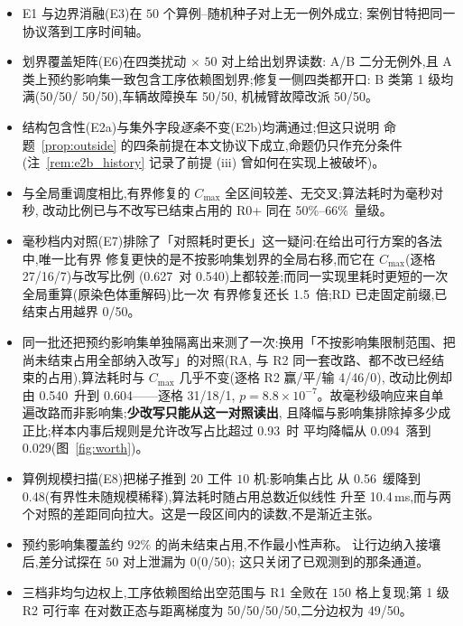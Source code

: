 \documentclass[manuscript,screen,review]{acmart}
\newcommand{\NPairs}{50}
\newcommand{\ResFracRtwo}{50\%--66\%}
\newcommand{\ClosureAliveFrac}{92\%}
\newcommand{\RedecodeRatio}{1.5}     %
\newcommand{\RedecodeBad}{0/\NPairs}
\newcommand{\WinVsShift}{27/16/7}    %
\newcommand{\WinVsAllFuture}{4/46/0}
\newcommand{\ResFracCheapRtwo}{0.540}
\newcommand{\ResFracShift}{0.627}
\newcommand{\ResFracAllFuture}{0.604}
\newcommand{\RAStabWTL}{31/18/1}     %
\newcommand{\RAStabP}{8.8\times10^{-7}}  %
\newcommand{\ScaleJobsHi}{20}
\newcommand{\ScaleMachHi}{10}
\newcommand{\ScaleCloLo}{0.48}       %
\newcommand{\ScaleCloHi}{0.56}       %
\newcommand{\ScaleMsHi}{10.4}        %
\newcommand{\WorthThresh}{0.93}
\newcommand{\WorthLowMean}{0.094}
\newcommand{\WorthHighMean}{0.029}
\newcommand{\ProbeLeakPairs}{0/50}
\newcommand{\ProbeLeaks}{0}
\newcommand{\FeasESixBlock}{\NPairs/\NPairs}
\newcommand{\FeasSlow}{\NPairs/\NPairs}
\newcommand{\FeasESixAgv}{\NPairs/\NPairs}
\newcommand{\FeasESixRa}{\NPairs/\NPairs}
\newcommand{\WeightLogRtwo}{\NPairs/\NPairs}
\newcommand{\WeightLuRtwo}{\NPairs/\NPairs}
\newcommand{\WeightSplitRtwo}{49/\NPairs}
\begin{document}
\begin{itemize}[leftmargin=1.5em,itemsep=0.25em]
\item E1 与边界消融(E3)在 \(\NPairs\) 个算例--随机种子对上无一例外成立;
案例甘特把同一协议落到工序时间轴。
\item 划界覆盖矩阵(E6)在四类扰动 \(\times\) \(\NPairs\) 对上给出划界读数:
A/B 二分无例外,且 A 类上预约影响集一致包含工序依赖图划界;修复一侧四类都开口:
B 类第 1 级均满(\FeasESixBlock / \FeasSlow),车辆故障换车 \FeasESixAgv,
机械臂故障改派 \FeasESixRa。
\item 结构包含性(E2a)与集外字段\emph{逐条}不变(E2b)均满通过;但这只说明
命题~\ref{prop:outside} 的四条前提在本文协议下成立,命题仍只作充分条件
(注~\ref{rem:e2b_history} 记录了前提 (iii) 曾如何在实现上被破坏)。
\item 与全局重调度相比,有界修复的 \(C_{\max}\) 全区间较差、无交叉;算法耗时为毫秒对秒,
改动比例已与不改写已结束占用的 R0+ 同在 \ResFracRtwo\ 量级。
\item 毫秒档内对照(E7)排除了「对照耗时更长」这一疑问:在给出可行方案的各法中,唯一比有界
修复更快的是不按影响集划界的全局右移,而它在 \(C_{\max}\)(逐格 \WinVsShift)与改写比例
(\ResFracShift\ 对 \ResFracCheapRtwo)上都较差;而同一实现里耗时更短的一次全局重算(原染色体重解码)比一次
有界修复还长 \RedecodeRatio\ 倍;RD 已走固定前缀,已结束占用越界 \RedecodeBad。
\item 同一批还把预约影响集单独隔离出来测了一次:换用「不按影响集限制范围、把尚未结束占用全部纳入改写」的对照(RA,
与 R2 同一套改路、都不改已经结束的占用),算法耗时与 \(C_{\max}\) 几乎不变(逐格 R2 赢/平/输 \WinVsAllFuture),
改动比例却由 \ResFracCheapRtwo\ 升到 \ResFracAllFuture——逐格 \RAStabWTL,
\(p=\RAStabP\)。故毫秒级响应来自单遍改路而非影响集;\textbf{少改写只能从这一对照读出},
且降幅与影响集排除掉多少成正比;样本内事后规则是允许改写占比超过 \WorthThresh\ 时
平均降幅从 \WorthLowMean\ 落到 \WorthHighMean(图~\ref{fig:worth})。
\item 算例规模扫描(E8)把梯子推到 \(\ScaleJobsHi\) 工件 \(\ScaleMachHi\) 机:影响集占比
从 \ScaleCloHi\ 缓降到 \ScaleCloLo(有界性未随规模稀释),算法耗时随占用总数近似线性
升至 \ScaleMsHi\,ms,而与两个对照的差距同向拉大。这是一段区间内的读数,不是渐近主张。
\item 预约影响集覆盖约 \(\ClosureAliveFrac\) 的尚未结束占用,不作最小性声称。
让行边纳入接壤后,差分试探在 \(\NPairs\) 对上泄漏为 \ProbeLeaks(\ProbeLeakPairs);
这只关闭了已观测到的那条通道。
\item 三档非均匀边权上,工序依赖图给出空范围与 R1 全败在 \(150\) 格上复现;第 1 级 R2 可行率
在对数正态与距离梯度为 \WeightLogRtwo/\WeightLuRtwo,二分边权为 \WeightSplitRtwo。

\end{itemize}
\end{document}
